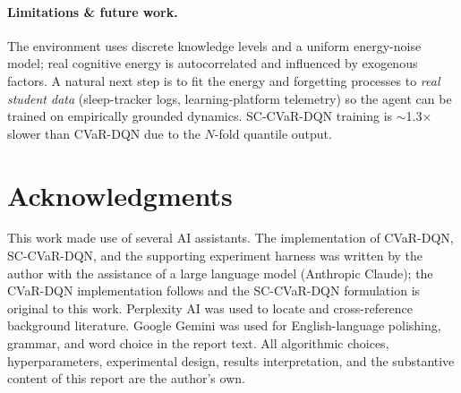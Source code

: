\documentclass[a4paper,11pt]{article}
\theoremstyle{definition}
\begin{document}
\paragraph{Limitations \& future work.} The environment uses discrete knowledge levels and a uniform energy-noise model; real cognitive energy is autocorrelated and influenced by exogenous factors. A natural next step is to fit the energy and forgetting processes to \emph{real student data} (sleep-tracker logs, learning-platform telemetry) so the agent can be trained on empirically grounded dynamics. SC-CVaR-DQN training is $\sim$1.3$\times$ slower than CVaR-DQN due to the $N$-fold quantile output.

\section*{Acknowledgments}

This work made use of several AI assistants. The implementation of CVaR-DQN, SC-CVaR-DQN, and the supporting experiment harness was written by the author with the assistance of a large language model (Anthropic Claude); the CVaR-DQN implementation follows \citet{dabney2018} and the SC-CVaR-DQN formulation is original to this work. Perplexity AI was used to locate and cross-reference background literature. Google Gemini was used for English-language polishing, grammar, and word choice in the report text. All algorithmic choices, hyperparameters, experimental design, results interpretation, and the substantive content of this report are the author's own.

\clearpage

\renewcommand{\refname}{References}
\end{document}
